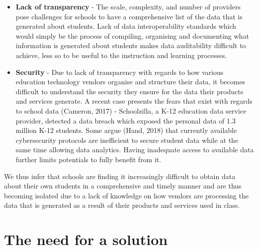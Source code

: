 \documentclass{article}
\begin{document}
\begin{itemize}
  \item \textbf{Lack of transparency} - The scale, complexity, and number of providers pose challenges for schools to have a comprehensive list of the data that is generated about students. Lack of data interoperability standards which would simply be the process of compiling, organising and documenting what information is generated about students makes data auditability difficult to achieve, less so to be useful to the instruction and learning processes. 
  
  \item \textbf{Security} - Due to lack of transparency with regards to how various education technology vendors organise and structure their data, it becomes difficult to understand the security they ensure for the data their products and services generate. A recent case  presents the fears that exist with regards to school data (Cameron, 2017) - Schoolzilla, a K-12 education data service provider, detected a data breach which exposed the personal data of 1.3 million K-12 students. Some argue (Hand, 2018) that currently available cybersecurity protocols are inefficient to secure student data while at the same time allowing data analytics. Having inadequate access to available data further limits potentials to fully benefit from it.
  
\end{itemize}

We thus infer that schools are finding it increasingly difficult to obtain data about their own students in a comprehensive and timely manner and are thus becoming isolated due to a lack of knowledge on how vendors are processing the data that is generated as a result of their products and services used in class.

\section{The need for a solution}
\end{document}
